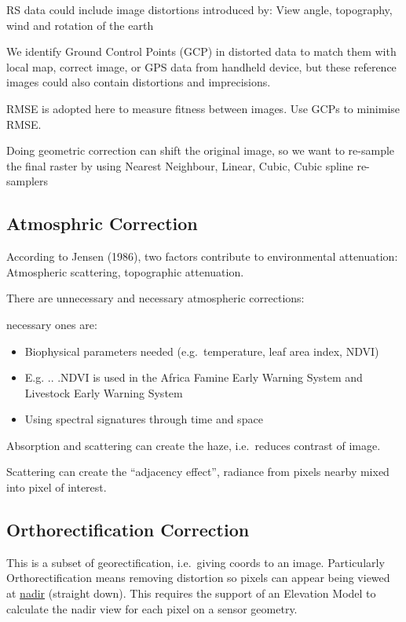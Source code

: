 \documentclass[
  letterpaper,
  DIV=11,
  numbers=noendperiod]{scrreprt}
\begin{document}
RS data could include image distortions introduced by: View angle,
topography, wind and rotation of the earth

We identify Ground Control Points (GCP) in distorted data to match them
with local map, correct image, or GPS data from handheld device, but
these reference images could also contain distortions and imprecisions.

RMSE is adopted here to measure fitness between images. Use GCPs to
minimise RMSE.

Doing geometric correction can shift the original image, so we want to
re-sample the final raster by using Nearest Neighbour, Linear, Cubic,
Cubic spline re-samplers

\hypertarget{atmosphric-correction}{%
\subsection{Atmosphric Correction}\label{atmosphric-correction}}

According to Jensen (1986), two factors contribute to environmental
attenuation: Atmospheric scattering, topographic attenuation.

There are unnecessary and necessary atmospheric corrections:

necessary ones are:

\begin{itemize}
\item
  Biophysical parameters needed (e.g.~temperature, leaf area index,
  NDVI)
\item
  E.g. .. .NDVI is used in the Africa Famine Early Warning System and
  Livestock Early Warning System
\item
  Using spectral signatures through time and space
\end{itemize}

Absorption and scattering can create the haze, i.e.~reduces contrast of
image.

Scattering can create the ``adjacency effect'', radiance from pixels
nearby mixed into pixel of interest.

\hypertarget{orthorectification-correction}{%
\subsection{Orthorectification
Correction}\label{orthorectification-correction}}

This is a subset of georectification, i.e.~giving coords to an image.
Particularly Orthorectification means removing distortion so pixels can
appear being viewed at \uline{nadir} (straight down). This requires the
support of an Elevation Model to calculate the nadir view for each pixel
on a sensor geometry.
\end{document}
